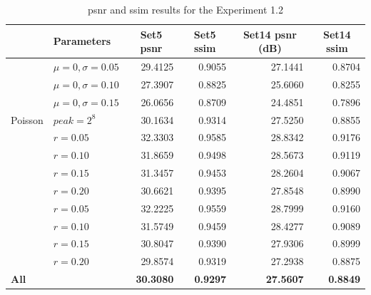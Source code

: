 \begin{table}[]
	\centering
	\begin{tabular}{|l|l|r|r|r|r|}
		\hline
		\rowcolor[HTML]{EFEFEF} 
		\multicolumn{1}{|c|}{\cellcolor[HTML]{EFEFEF}\textbf{Noise}} & \textbf{Parameters} & \multicolumn{1}{c|}{\cellcolor[HTML]{EFEFEF}\textbf{Set5 \gls{psnr}}} & \multicolumn{1}{c|}{\cellcolor[HTML]{EFEFEF}\textbf{Set5 \gls{ssim}}} & \multicolumn{1}{c|}{\cellcolor[HTML]{EFEFEF}\textbf{Set14 \gls{psnr} (dB)}} & \multicolumn{1}{c|}{\cellcolor[HTML]{EFEFEF}\textbf{Set14 \gls{ssim}}} \\ \hline
		\rowcolor[HTML]{FFFFFF} 
		\cellcolor[HTML]{EFEFEF} & $\mu=0, \sigma=0.05$ & 29.4125 & 0.9055 & 27.1441 & 0.8704 \\
		\rowcolor[HTML]{EFEFEF} 
		\cellcolor[HTML]{EFEFEF} & $\mu=0, \sigma=0.10$ & 27.3907 & 0.8825 & 25.6060 & 0.8255 \\
		\rowcolor[HTML]{FFFFFF} 
		\multirow{-3}{*}{\cellcolor[HTML]{EFEFEF}Gaussian} & $\mu=0, \sigma=0.15$ & 26.0656 & 0.8709 & 24.4851 & 0.7896 \\
		\rowcolor[HTML]{EFEFEF} 
		Poisson & $peak=2^8$ & 30.1634 & 0.9314 & 27.5250 & 0.8855 \\
		\rowcolor[HTML]{FFFFFF} 
		\cellcolor[HTML]{EFEFEF} & $r=0.05$ & 32.3303 & 0.9585 & 28.8342 & 0.9176 \\
		\rowcolor[HTML]{EFEFEF} 
		\cellcolor[HTML]{EFEFEF} & $r=0.10$ & 31.8659 & 0.9498 & 28.5673 & 0.9119 \\
		\rowcolor[HTML]{FFFFFF} 
		\cellcolor[HTML]{EFEFEF} & $r=0.15$ & 31.3457 & 0.9453 & 28.2604 & 0.9067 \\
		\rowcolor[HTML]{EFEFEF} 
		\multirow{-4}{*}{\cellcolor[HTML]{EFEFEF}Salt-and-pepper} & $r=0.20$ & 30.6621 & 0.9395 & 27.8548 & 0.8990 \\
		\rowcolor[HTML]{FFFFFF} 
		\cellcolor[HTML]{EFEFEF} & $r=0.05$ & 32.2225 & 0.9559 & 28.7999 & 0.9160 \\
		\rowcolor[HTML]{EFEFEF} 
		\cellcolor[HTML]{EFEFEF} & $r=0.10$ & 31.5749 & 0.9459 & 28.4277 & 0.9089 \\
		\rowcolor[HTML]{FFFFFF} 
		\cellcolor[HTML]{EFEFEF} & $r=0.15$ & 30.8047 & 0.9390 & 27.9306 & 0.8999 \\
		\rowcolor[HTML]{EFEFEF} 
		\multirow{-4}{*}{\cellcolor[HTML]{EFEFEF}Uniform} & $r=0.20$ & 29.8574 & 0.9319 & 27.2938 & 0.8875 \\
		\rowcolor[HTML]{FFFFFF} 
		\textbf{All} &  & \textbf{30.3080} & \textbf{0.9297} & \textbf{27.5607} & \textbf{0.8849}\\\hline
	\end{tabular}
	\caption{\gls{psnr} and \gls{ssim} results for the Experiment 1.2}
	\label{tab:experiment12}
\end{table}

